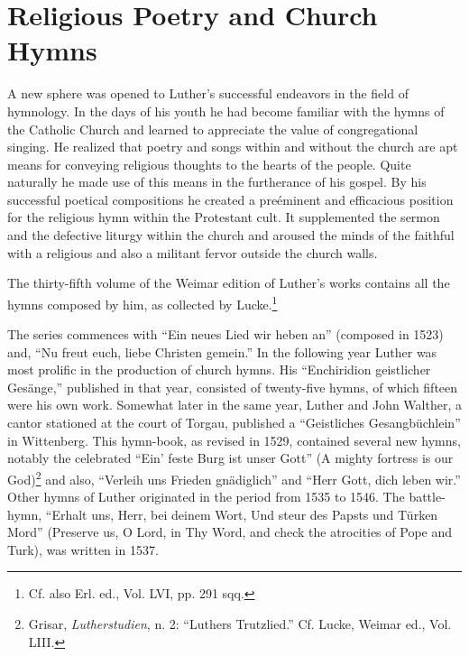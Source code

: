 \section{Religious Poetry and Church Hymns}

A new sphere was opened to Luther’s successful endeavors in the
field of hymnology. In the days of his youth he had become familiar
with the hymns of the Catholic Church and learned to appreciate the value
of congregational singing. He realized that poetry and
songs within and without the church are apt means for conveying
religious thoughts to the hearts of the people. Quite naturally he made
use of this means in the furtherance of his gospel. By his successful
poetical compositions he created a preéminent and efficacious position
for the religious hymn within the Protestant cult. It supplemented
the sermon and the defective liturgy within the church and aroused
the minds of the faithful with a religious and also a militant fervor
outside the church walls.

The thirty-fifth volume of the Weimar edition of Luther’s works
contains all the hymns composed by him, as collected by Lucke.\footnote{Cf. also Erl. ed., Vol. LVI, pp. 291 sqq.}

The series commences with “Ein neues Lied wir heben an” (composed
in 1523) and, “Nu freut euch, liebe Christen gemein.” In the following
year Luther was most prolific in the production of church
hymns. His “Enchiridion geistlicher Gesänge,” published in that
year, consisted of twenty-five hymns, of which fifteen were his own
work. Somewhat later in the same year, Luther and John Walther,
a cantor stationed at the court of Torgau, published a “Geistliches
Gesangbüchlein” in Wittenberg. This hymn-book, as revised in 1529,
contained several new hymns, notably the celebrated “Ein’ feste Burg
ist unser Gott” (A mighty fortress is our God)\footnote{Grisar, \textit{Lutherstudien}, n. 2: “Luthers Trutzlied.” Cf. Lucke, Weimar ed., Vol. LIII.}
 and also, “Verleih
uns Frieden gnädiglich” and “Herr Gott, dich leben wir.” Other
hymns of Luther originated in the period from 1535 to 1546. The
battle-hymn, “Erhalt uns, Herr, bei deinem Wort, Und steur des
Papsts und Türken Mord” (Preserve us, O Lord, in Thy Word, and
check the atrocities of Pope and Turk), was written in 1537.

